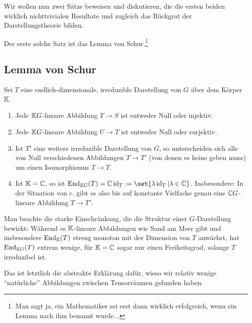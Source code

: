 \begin{remark}
Wir wollen nun zwei Sätze beweisen und diskutieren, die die ersten beiden wirklich nichttrivialen Resultate und zugleich das Rückgrat der Darstellungstheorie bilden.

\smallbreak
Der erste solche Satz ist das Lemma von Schur.\footnote{Man sagt ja, ein Mathematiker sei erst dann wirklich erfolgreich, wenn ein Lemma nach ihm benannt wurde...}
\end{remark}

\subsection{Lemma von Schur}
\begin{theorem}\label{darstellungen:schur}
Sei $T$ eine endlich-dimensionale, irreduzible Darstellung von $G$ über dem Körper $\mathbb{K}$.
\begin{enumerate}
\item Jede $\mathbb{K} G$-lineare Abbildung $T\to S$ ist entweder Null oder injektiv.
\item Jede $\mathbb{K} G$-lineare Abbildung $U\to T$ ist entweder Null oder surjektiv.
\item Ist $T'$ eine weitere irreduzible Darstellung von $G$, so unterscheiden sich alle von Null verschiedenen Abbildungen $T\to T'$ (von denen es keine geben muss) um einen Isomorphismus $T\to T$.
\item Ist $\mathbb{K}=\mathbb{C}$, so ist $\End_{\IK G}(T) = \IC\id_T := \set{\lambda\id_T | \lambda\in\IC}$. Insbesondere: In der Situation von c. gibt es also bis auf konstante Vielfache genau eine $\mathbb{C} G$-lineare Abbildung $T\to T'$.
\end{enumerate}
\end{theorem}

\begin{remark}
Man beachte die starke Einschränkung, die die Struktur einer $G$-Darstellung bewirkt: Während es $\mathbb{K}$-lineare Abbildungen wie Sand am Meer gibt und insbesondere $\operatorname{End}_{\mathbb{K}}(T)$ streng monoton mit der Dimension von $T$ anwächst, hat $\operatorname{End}_{\mathbb{K} G}(T)$ extrem wenige, für $\mathbb{K}=\mathbb{C}$ sogar nur einen Freiheitsgrad, solange $T$ irreduzibel ist.

Das ist letztlich die abstrakte Erklärung dafür, wieso wir relativ wenige \enquote{natürliche} Abbildungen zwischen Tensorräumen gefunden haben.
\end{remark}

